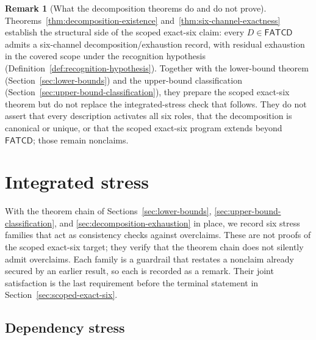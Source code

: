 \documentclass[11pt]{article}
\theoremstyle{definition}
\newtheorem{remark}[theorem]{Remark}
\newcommand{\FATCD}{\ensuremath{\mathsf{FATCD}}}
\begin{document}
\begin{remark}[What the decomposition theorems do and do not prove]\label{rem:dec-scope}
Theorems~\ref{thm:decomposition-existence}
and~\ref{thm:six-channel-exactness} establish the structural side of
the scoped exact-six claim: every \(D \in \FATCD{}\) admits a
six-channel decomposition/exhaustion record, with residual exhaustion in the
covered scope under the recognition hypothesis
(Definition~\ref{def:recognition-hypothesis}). Together with the lower-bound theorem
(Section~\ref{sec:lower-bounds}) and the upper-bound classification
(Section~\ref{sec:upper-bound-classification}), they prepare the
scoped exact-six theorem but do not replace the integrated-stress
check that follows. They do not assert that every description
activates all six roles, that the decomposition is canonical or
unique, or that the scoped exact-six program extends beyond \FATCD{};
those remain nonclaims.
\end{remark}

 \section{Integrated stress}\label{sec:integrated-stress}




With the theorem chain of Sections~\ref{sec:lower-bounds},
\ref{sec:upper-bound-classification}, and
\ref{sec:decomposition-exhaustion} in place, we record six stress
families that act as consistency checks against overclaims. These are
not proofs of the scoped exact-six target; they verify that the
theorem chain does not silently admit overclaims. Each family is a
guardrail that restates a nonclaim already secured by an earlier
result, so each is recorded as a remark. Their joint satisfaction is
the last requirement before the terminal statement in
Section~\ref{sec:scoped-exact-six}.

\subsection{Dependency stress}\label{subsec:dependency-stress}
\end{document}
